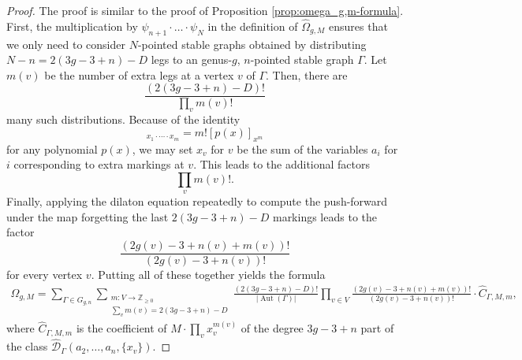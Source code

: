 \documentclass[10pt,a4paper]{amsart}
\DeclareMathOperator{\Aut}{Aut}
\begin{document}
\begin{proof}
The proof is similar to the proof of Proposition \ref{prop:omega_g,m-formula}.   First, the multiplication by $\psi_{n+1} \cdot \dots \cdot \psi_N$
  in the definition of $\widehat{\Omega}_{g, M}$ ensures that we only need to
  consider $N$-pointed stable graphs obtained by distributing
  $N-n = 2(3g-3+n)-D$ legs to an genus-$g$, $n$-pointed stable graph
  $\Gamma$.
  Let $m(v)$ be the number of extra legs at a vertex $v$ of $\Gamma$.
  Then, there are
  \begin{equation*}
    \frac{(2(3g-3+n)-D)!}{\prod_v m(v)!}
  \end{equation*}
  many such distributions.
  Because of the identity
  \begin{equation*}
    [p(x_1 + \dotsb + x_m)]_{x_1 \cdot \dotsb \cdot x_m}
    = m! [p(x)]_{x^m}
  \end{equation*}
  for any polynomial $p(x)$, we may set $x_v$ for $v$ be the
  sum of the variables $a_i$ for $i$ corresponding to extra markings
  at $v$.
  This leads to the additional factors
  \begin{equation*}
\prod_{v} m(v)!.  \end{equation*}
  Finally, applying the dilaton equation repeatedly to compute the
  push-forward under the map forgetting the last $2(3g-3+n)-D$ markings
  leads to the factor
  \begin{equation*}
    \frac{(2g(v) - 3 + n(v) + m(v))!}{(2g(v) - 3 + n(v))!}
  \end{equation*}
  for every vertex $v$.
  Putting all of these together yields the formula
  \begin{align}\label{eqn:hat-omega_g,m-formula}
   \widehat{\Omega}_{g, M}
    = \sum_{\Gamma\in G_{g,n}} \sum_{\substack{m\colon V \to \mathbb Z_{\ge 0} \\ \sum_v m(v) = 2(3g-3+n)-D}}
    \frac{(2(3g-3+n)-D)!}{|\Aut(\Gamma)|}
    \prod_{v \in V} \frac{(2g(v) - 3 + n(v) + m(v))!}{(2g(v) - 3 + n(v))!} \cdot \widehat{C}_{\Gamma, M, m},
  \end{align}
  where 
  $\widehat{C}_{\Gamma, M, m}$ is the coefficient of
  $M \cdot \prod_v x_v^{m(v)}$ of the degree $3g-3+n$ part of
  the class $\widehat{\mathcal{D}}_{\Gamma}(a_2, \dotsc, a_n, \{x_v\})$.



\end{proof}
\end{document}
